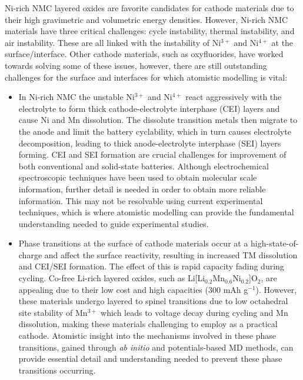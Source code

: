 \documentclass[../main.tex]{subfiles}
\begin{document}
Ni-rich NMC layered oxides are favorite candidates for cathode materials due to their high gravimetric and volumetric energy densities.\cite{li2020high} However, Ni-rich NMC materials have three critical challenges: cycle instability, thermal instability, and air instability. These are all linked with the instability of Ni$^{3+}$ and Ni$^{4+}$ at the surface/interface. Other cathode materials, such as oxyfluorides, have worked towards solving some of these issues, however, there are still outstanding challenges for the surface and interfaces for which atomistic modelling is vital:
\begin{itemize}
    \item In Ni-rich NMC the unstable Ni$^{3+}$ and Ni$^{4+}$ react aggressively with the electrolyte to form thick cathode-electrolyte interphase (CEI) layers and cause Ni and Mn dissolution. The dissolute transition metals then migrate to the anode and limit the battery cyclability, \cite{li2017dynamic,li2018mn} which in turn causes electrolyte decomposition, leading to thick anode-electrolyte interphase (SEI) layers forming. CEI and SEI formation are crucial challenges for improvement of both conventional and solid-state batteries. Although electrochemical spectroscopic techniques have been used to obtain molecular scale information, further detail is needed in order to obtain more reliable information. This may not be resolvable using current experimental techniques, which is where atomistic modelling can provide the fundamental understanding needed to guide experimental studies.
    \item Phase transitions at the surface of cathode materials occur at a high-state-of-charge and affect the surface reactivity, resulting in increased TM dissolution and CEI/SEI formation. The effect of this is rapid capacity fading during cycling. \cite{li2019comprehensive} Co-free Li-rich layered oxides, such as Li[Li$_{0.2}$Mn$_{0.6}$Ni$_{0.2}$]O$_{2}$, are appealing due to their low cost and high capacities (300 mAh g$^{-1}$). \cite{kim2004electrochemical,armstrong2006demonstrating} However, these materials undergo layered to spinel transitions due to low octahedral site stability of Mn$^{3+}$ which leads to voltage decay during cycling and Mn dissolution,\cite{MnDissolution2016} making these materials challenging to employ as a practical cathode. Atomistic insight into the mechanisms involved in these phase transitions, gained through \textit{ab initio} and potentials-based MD methods, can provide essential detail and understanding needed to prevent these phase transitions occurring.

\end{itemize}
\end{document}
